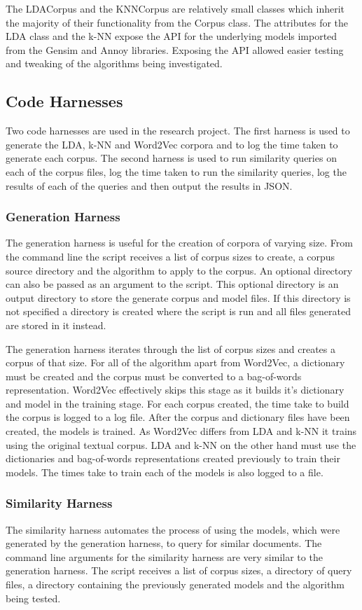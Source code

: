 The LDACorpus and the KNNCorpus are relatively small classes which inherit the majority of their functionality from the Corpus class.
The attributes for the LDA class and the k-NN expose the API for the underlying models imported from the Gensim and Annoy libraries.
Exposing the API allowed easier testing and tweaking of the algorithms being investigated.

\subsection{Code Harnesses}
Two code harnesses are used in the research project. The first harness is used to generate the LDA, k-NN and Word2Vec corpora and to log the time taken to generate each corpus.
The second harness is used to run similarity queries on each of the corpus files, log the time taken to run the similarity queries, log the results of each of the queries and then output the results in JSON.

\subsubsection{Generation Harness}
The generation harness is useful for the creation of corpora of varying size.
From the command line the script receives a list of corpus sizes to create, a corpus source directory and the algorithm to apply to the corpus.
An optional directory can also be passed as an argument to the script.
This optional directory is an output directory to store the generate corpus and model files.
If this directory is not specified a directory is created where the script is run and all files generated are stored in it instead.

The generation harness iterates through the list of corpus sizes and creates a corpus of that size.
For all of the algorithm apart from Word2Vec, a dictionary must be created and the corpus must be converted to a bag-of-words representation.
Word2Vec effectively skips this stage as it builds it's dictionary and model in the training stage.
For each corpus created, the time take to build the corpus is logged to a log file.
After the corpus and dictionary files have been created, the models is trained.
As Word2Vec differs from LDA and k-NN it trains using the original textual corpus.
LDA and k-NN on the other hand must use the dictionaries and bag-of-words representations created previously to train their models.
The times take to train each of the models is also logged to a file.

\subsubsection{Similarity Harness}
The similarity harness automates the process of using the models, which were generated by the generation harness, to query for similar documents.
The command line arguments for the similarity harness are very similar to the generation harness.
The script receives a list of corpus sizes, a directory of query files, a directory containing the previously generated models and the algorithm being tested.

